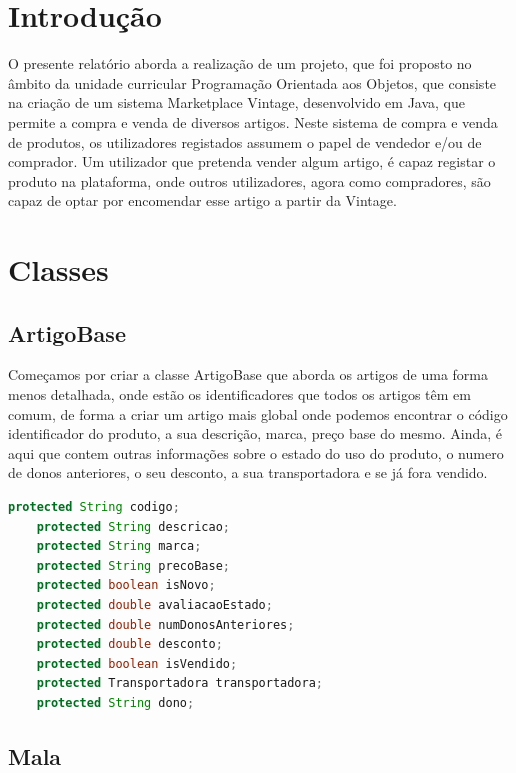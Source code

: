 \documentclass[a4paper]{report}
\begin{document}
    \tableofcontents

    \pagebreak

    \chapter{Introdução}
    O presente relatório aborda a realização de um projeto, que foi proposto no âmbito da unidade curricular Programação Orientada aos Objetos, que consiste na criação de um sistema Marketplace Vintage, desenvolvido em Java, que permite a compra e venda de diversos artigos. Neste sistema de compra e venda de produtos, os utilizadores registados assumem o papel de vendedor e/ou de comprador. Um utilizador que pretenda vender algum artigo, é capaz registar o produto na plataforma, onde outros utilizadores, agora como compradores, são capaz de optar por encomendar esse artigo a partir da Vintage.

    \chapter{Classes}
    
    \section{ArtigoBase}
    
    Começamos por criar a classe ArtigoBase que aborda os artigos de uma forma menos detalhada, onde estão os identificadores que todos os artigos têm em comum, de forma a criar um artigo mais global onde podemos encontrar o código identificador do produto, a sua descrição, marca, preço base do mesmo. Ainda, é aqui que contem outras informações sobre o estado do uso do produto, o numero de donos anteriores, o seu desconto, a sua transportadora e se já fora vendido.
    
    \begin{lstlisting}[language=java]
    protected String codigo;
    protected String descricao;
    protected String marca;
    protected String precoBase;
    protected boolean isNovo;
    protected double avaliacaoEstado;
    protected double numDonosAnteriores;
    protected double desconto;
    protected boolean isVendido;
    protected Transportadora transportadora;
    protected String dono;
    \end{lstlisting}

    \section{Mala}
    
\end{document}
